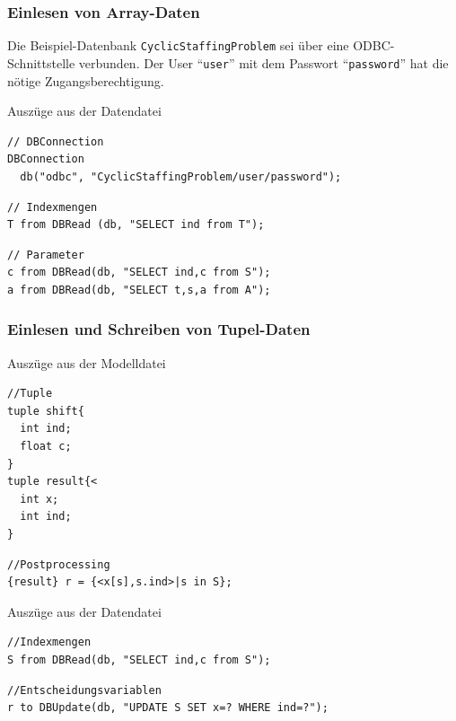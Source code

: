 \begin{frame}[fragile]
 \frametitle{Einlesen von Array-Daten}
 Die Beispiel-Datenbank \texttt{CyclicStaffingProblem} sei über eine ODBC-Schnittstelle verbunden. Der User "`\texttt{user}"' mit dem Passwort "`\texttt{password}"' hat die nötige Zugangsberechtigung.
 \begin{block}{Auszüge aus der Datendatei}
\begin{lstlisting}[language=opldata,numbers=none,basicstyle=\ttfamily\scriptsize]
// DBConnection
DBConnection 
  db("odbc", "CyclicStaffingProblem/user/password");
\end{lstlisting}\vspace{-2\baselineskip}
\begin{lstlisting}[language=opldata,numbers=none,basicstyle=\ttfamily\scriptsize]
// Indexmengen
T from DBRead (db, "SELECT ind from T");
\end{lstlisting}\vspace{-2\baselineskip}
\begin{lstlisting}[language=opldata,numbers=none,basicstyle=\ttfamily\scriptsize]
// Parameter
c from DBRead(db, "SELECT ind,c from S");
a from DBRead(db, "SELECT t,s,a from A");
\end{lstlisting}
 \end{block}
\end{frame}

\begin{frame}[fragile]
 \frametitle{Einlesen und Schreiben von Tupel-Daten}
 \begin{block}{Auszüge aus der Modelldatei}
\begin{lstlisting}[language=opl,numbers=none,basicstyle=\ttfamily\scriptsize]
//Tuple
tuple shift{
  int ind;
  float c;
}
tuple result{<
  int x;
  int ind;
}  
\end{lstlisting}\vspace{-2\baselineskip}
\begin{lstlisting}[language=opl,numbers=none,basicstyle=\ttfamily\scriptsize]
//Postprocessing
{result} r = {<x[s],s.ind>|s in S};
\end{lstlisting}
 \end{block}\vspace{-2\baselineskip}
 \begin{block}{Auszüge aus der Datendatei}
\begin{lstlisting}[language=opldata,numbers=none,basicstyle=\ttfamily\scriptsize]
//Indexmengen
S from DBRead(db, "SELECT ind,c from S");
\end{lstlisting}\vspace{-2\baselineskip}
\begin{lstlisting}[language=opldata,numbers=none,basicstyle=\ttfamily\scriptsize]
//Entscheidungsvariablen
r to DBUpdate(db, "UPDATE S SET x=? WHERE ind=?");
\end{lstlisting}
 \end{block}
\end{frame}

